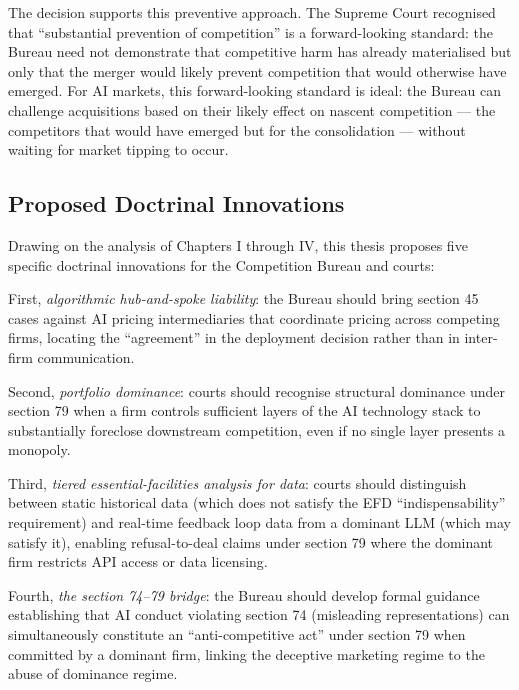 The  decision supports this preventive approach. The Supreme Court recognised that ``substantial prevention of competition'' is a forward-looking standard: the Bureau need not demonstrate that competitive harm has already materialised but only that the merger would likely prevent competition that would otherwise have emerged. For AI markets, this forward-looking standard is ideal: the Bureau can challenge acquisitions based on their likely effect on nascent competition --- the competitors that would have emerged but for the consolidation --- without waiting for market tipping to occur.

\subsection{Proposed Doctrinal Innovations}

Drawing on the analysis of Chapters I through IV, this thesis proposes five specific doctrinal innovations for the Competition Bureau and courts:

First, \textit{algorithmic hub-and-spoke liability}: the Bureau should bring section 45 cases against AI pricing intermediaries that coordinate pricing across competing firms, locating the ``agreement'' in the deployment decision rather than in inter-firm communication.

Second, \textit{portfolio dominance}: courts should recognise structural dominance under section 79 when a firm controls sufficient layers of the AI technology stack to substantially foreclose downstream competition, even if no single layer presents a monopoly.

Third, \textit{tiered essential-facilities analysis for data}: courts should distinguish between static historical data (which does not satisfy the EFD ``indispensability'' requirement) and real-time feedback loop data from a dominant LLM (which may satisfy it), enabling refusal-to-deal claims under section 79 where the dominant firm restricts API access or data licensing.

Fourth, \textit{the section 74--79 bridge}: the Bureau should develop formal guidance establishing that AI conduct violating section 74 (misleading representations) can simultaneously constitute an ``anti-competitive act'' under section 79 when committed by a dominant firm, linking the deceptive marketing regime to the abuse of dominance regime.

